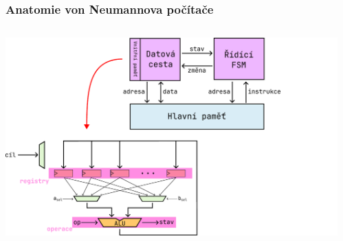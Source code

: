\documentclass[aspectratio=169,11pt,svgnames]{beamer}
\begin{document}
\begin{frame}
 \frametitle{Anatomie von Neumannova počítače}
 \begin{columns}[T]
  \begin{column}{.6\textwidth}
   \vspace*{-1em}
   \begin{center}
    \includegraphics[width=1.2\textwidth]{anatomy-3.pdf}
   \end{center}
  \end{column}
  \begin{column}{.39\textwidth}
  \end{column}
 \end{columns}
\end{frame}
\end{document}
